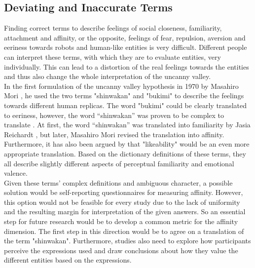 \subsection{Deviating and Inaccurate Terms}
Finding correct terms to describe feelings of social closeness, familiarity, attachment and affinity, or the opposite, feelings of fear, repulsion, aversion and eeriness towards robots and human-like entities is very difficult. Different people can interpret these terms, with which they are to evaluate entities, very individually. This can lead to a distortion of the real feelings towards the entities and thus also change the whole interpretation of the uncanny valley.\\
In the first formulation of the uncanny valley hypothesis in 1970 by Masahiro Mori \cite{original_masahiro_not_translated}, he used the two terms "shinwakan" and "bukimi" to describe the feelings towards different human replicas. The word "bukimi" could be clearly translated to eeriness, however, the word “shinwakan” was proven to be complex to translate \cite{quant_review}. At first, the word “shinwakan” was translated into familiarity by Jasia Reichardt \cite{first_translation}, but later, Masahiro Mori revised the translation into affinity. Furthermore, it has also been argued by \cite{uncanny_cliff} that "likeability" would be an even more appropriate translation. Based on the dictionary definitions of these terms, they all describe slightly different aspects of perceptual familiarity and emotional valence.\\ Given these terms' complex definitions and ambiguous character, a possible solution would be self-reporting questionnaires for measuring affinity. However, this option would not be feasible for every study due to the lack of uniformity and the resulting margin for interpretation of the given answers. So an essential step for future research would be to develop a common metric for the affinity dimension. The first step in this direction would be to agree on a translation of the term "shinwakan". Furthermore, studies also need to explore how participants perceive the expressions used and draw conclusions about how they value the different entities based on the expressions. 

